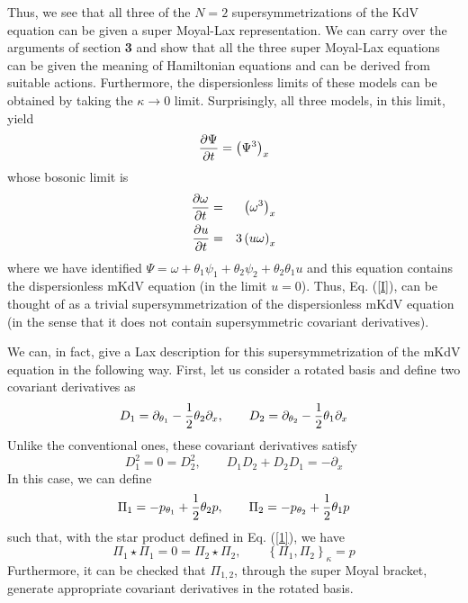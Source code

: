 \documentclass[a4paper,11pt]{article}
\begin{document}
Thus, we see that all three of the $N=2$ supersymmetrizations of the
KdV equation can be given a super Moyal-Lax
representation. We can carry over the arguments of section {\bf 3} and
show that all the three super Moyal-Lax equations can be given the
meaning of Hamiltonian equations and can be derived from suitable
actions. Furthermore, the dispersionless limits of these models
can be obtained by taking the $\kappa\rightarrow 0$
limit. Surprisingly, all three models, in this limit, yield
\begin{equation}
{\partial \Psi\over \partial t} = \left(\Psi^{3}\right)_{x}\label{I}
\end{equation}
whose bosonic limit is
\begin{eqnarray}
{\partial\omega\over \partial t} & = &
\left(\omega^{3}\right)_{x}\nonumber\\
{\partial u\over \partial t} & = & 3 \left(u\omega\right)_{x}
\end{eqnarray}
where we have identified $\Psi = \omega + \theta_{1}\psi_{1} +
\theta_{2}\psi_{2} + 
\theta_{2}\theta_{1} u$ and this equation contains the dispersionless
mKdV equation (in the limit $u=0$). Thus, Eq. (\ref{I}), can be
thought of as a trivial supersymmetrization of the dispersionless mKdV
equation (in the sense that it does not contain supersymmetric
covariant derivatives).

We can, in fact, give a Lax description for this supersymmetrization
of the mKdV equation \cite{20} in the following way. First, let us
consider  a
rotated  basis and define two covariant derivatives as
\begin{equation}
D_{1} = \partial_{\theta_{1}} - {1\over 2} \theta_{2}
\partial_{x},\qquad D_{2} = \partial_{\theta_{2}} - {1\over 2}
\theta_{1} \partial_{x}
\end{equation}
Unlike the conventional ones, these covariant derivatives satisfy
\begin{equation}
D_{1}^{2} = 0 = D_{2}^{2},\qquad D_{1}D_{2}+D_{2}D_{1} = -
\partial_{x}
\end{equation}
In this case, we can define
\begin{equation}
\Pi_{1} = - p_{\theta_{1}} + {1\over 2} \theta_{2} p,\qquad \Pi_{2} =
- p_{\theta_{2}} + {1\over 2} \theta_{1} p
\end{equation}
such that, with the star product defined in Eq. (\ref{1}), we have
\begin{equation}
\Pi_{1}\star \Pi_{1} = 0 = \Pi_{2}\star \Pi_{2},\qquad
\left\{\Pi_{1},\Pi_{2}\right\}_{\kappa} = p
\end{equation}
Furthermore, it can be checked that $\Pi_{1,2}$, through the super
Moyal bracket, generate appropriate covariant derivatives in the
rotated basis.
\end{document}
